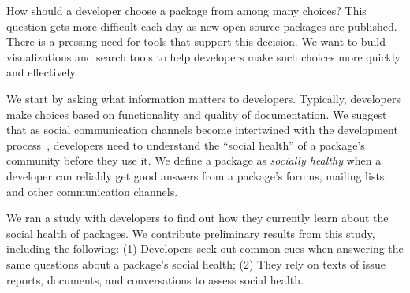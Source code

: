 How should a developer choose a package from among many choices?
This question gets more difficult each day as new open source packages are published.
There is a pressing need for tools that support this decision.
We want to build visualizations and search tools to help developers make such choices more quickly and effectively.

We start by asking what information matters to developers.
Typically, developers make choices based on functionality and quality of documentation.
We suggest that as social communication channels become intertwined with the development process~\cite{storey_revolution_2014},
developers need to understand the ``social health'' of a package's community before they use it.
We define a package as \textit{socially healthy} when a developer can reliably get good answers from a package's forums, mailing lists, and other communication channels.

We ran a study with developers to find out how they currently learn about the social health of packages.
We contribute preliminary results from this study, including the following:
(1) Developers seek out common cues when answering the same questions about a package's social health;
(2) They rely on texts of issue reports, documents, and conversations to assess social health.

